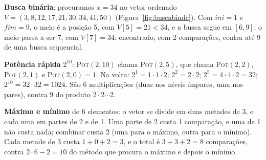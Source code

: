 \begin{exemplo}\label{ex:outrosdc}
\textbf{Busca binária}: procuramos $x=34$ no vetor ordenado $V=(3,8,12,\allowbreak17,21,30,\allowbreak34,41,50)$ (Figura~\ref{fig:buscabindc}). Com $ini=1$ e $fim=9$, o meio é a posição 5, com $V[5]=21<34$, e a busca segue em $[6,9]$; o meio passa a ser 7, com $V[7]=34$: encontrado, com 2 comparações, contra até 9 de uma busca sequencial.

\textbf{Potência rápida} $2^{10}$: \textsc{Pot}$(2,10)$ chama \textsc{Pot}$(2,5)$, que chama \textsc{Pot}$(2,2)$, \textsc{Pot}$(2,1)$ e \textsc{Pot}$(2,0)=1$. Na volta: $2^1=1\cdot1\cdot2$; $2^2=2\cdot2$; $2^5=4\cdot4\cdot2=32$; $2^{10}=32\cdot32=1024$. São 6 multiplicações (duas nos níveis ímpares, uma nos pares), contra 9 do produto $2\cdot2\cdots2$.

\textbf{Máximo e mínimo} de 6 elementos: o vetor se divide em duas metades de 3, e cada uma em partes de 2 e de 1. Uma parte de 2 custa 1 comparação, e uma de 1 não custa nada; combinar custa 2 (uma para o máximo, outra para o mínimo). Cada metade de 3 custa $1+0+2=3$, e o total é $3+3+2=8$ comparações, contra $2\cdot6-2=10$ do método que procura o máximo e depois o mínimo.
\end{exemplo}


